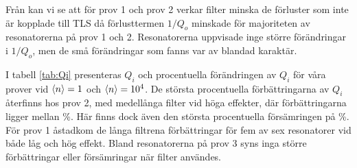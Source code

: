\documentclass[main.tex]{subfiles}
\begin{document}
Från  kan vi se att för prov 1 och prov 2 verkar filter minska de förluster som inte är kopplade till TLS då förlusttermen $1/Q_o$ minskade för majoriteten av resonatorerna på prov 1 och 2. Resonatorerna uppvisade inge större förändringar i $1/Q_o$, men de små förändringar som fanns var av blandad karaktär.







I tabell \ref{tab:Qi} presenteras $Q_i$ och procentuella förändringen av $Q_i$ för våra prover vid $\expval{n}=1$ och $\expval{n}=10^4$. De största procentuella förbättringarna av $Q_i$ återfinns hos prov 2, med medellånga filter vid höga effekter, där förbättringarna ligger mellan \unit[11-46]{\%}. Här finns dock även den största procentuella försämringen på \unit[-46]{\%}. För prov 1 åstadkom de långa filtrena förbättringar för fem av sex resonatorer vid både låg och hög effekt. Bland resonatorerna på prov 3 syns inga större förbättringar eller försämringar när filter användes.
\end{document}
